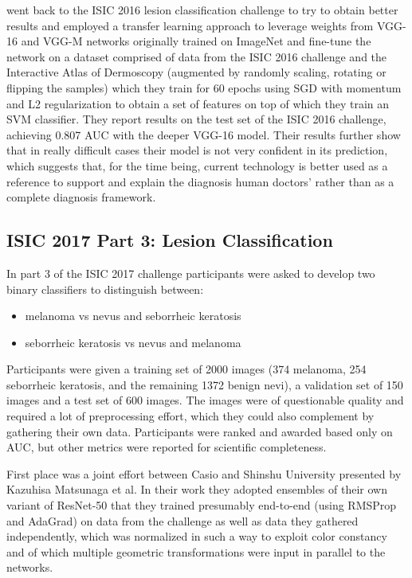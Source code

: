 \citeauthor{menegola2017} \cite{menegola2017} went back to the ISIC 2016 lesion classification challenge to try to obtain better results and employed a transfer learning approach to leverage weights from VGG-16 and VGG-M networks originally trained on ImageNet and fine-tune the network on a dataset comprised of data from the ISIC 2016 challenge and the Interactive Atlas of Dermoscopy (augmented by randomly scaling, rotating or flipping the samples) which they train for 60 epochs using \ac{SGD} with momentum and L2 regularization to obtain a set of features on top of which they train an SVM classifier. They report results on the test set of the ISIC 2016 challenge, achieving 0.807 AUC with the deeper VGG-16 model. Their results further show that in really difficult cases their model is not very confident in its prediction, which suggests that, for the time being, current technology is better used as a reference to support and explain the diagnosis human doctors' rather than as a complete diagnosis framework.

\subsection{ISIC 2017 Part 3: Lesion Classification}

In part 3 of the ISIC 2017 \cite{isic2017} challenge participants were asked to develop two binary classifiers to distinguish between:

\begin{itemize}
    \item melanoma vs nevus and seborrheic keratosis
    \item seborrheic keratosis vs nevus and melanoma
\end{itemize}

Participants were given a training set of 2000 images (374 melanoma, 254 seborrheic keratosis, and the remaining 1372 benign nevi), a validation set of 150 images and a test set of 600 images. The images were of questionable quality and required a lot of preprocessing effort, which they could also complement by gathering their own data. Participants were ranked and awarded based only on AUC, but other metrics were reported for scientific completeness.

First place was a joint effort between Casio and Shinshu University presented by Kazuhisa Matsunaga et al\cite{isic2017first}. In their work they adopted ensembles of their own variant of ResNet-50 that they trained presumably end-to-end (using RMSProp\cite{rmsprop} and AdaGrad\cite{adagrad}) on data from the challenge as well as data they gathered independently, which was normalized in such a way to exploit color constancy and of which multiple geometric transformations were input in parallel to the networks.

